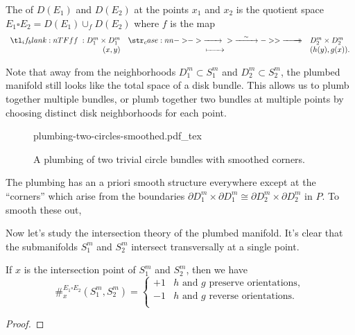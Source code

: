 \begin{definition}\label{def:plumbing}
	The  of $D(E_1)$ and $D(E_2)$ at the points $x_1$ and $x_2$ is the quotient space $E_1\square E_2 =D(E_1)\cup_f D(E_2)$ where $f$ is the map
	\[
		\lkxfunc{f}{D_1^m\times D_1^m}{D_2^m\times D_2^m}{(x,y)}{(h(y), g(x)).}
	\]
\end{definition}

Note that away from the neighborhoods $D_1^m\subset S^m_1$ and $D_2^m\subset S^m_2$, the plumbed manifold still looks like the total space of a disk bundle. This allows us to plumb together multiple bundles, or plumb together two bundles at multiple points by choosing distinct disk neighborhoods for each point.

\begin{figure}[ht]
	\centering
	{plumbing-two-circles-smoothed.pdf_tex}
	\caption{A plumbing of two trivial circle bundles with smoothed corners.}\label{fig:plumbing-two-circles}
\end{figure}

\begin{remark}\label{rmk:smoothing-corners}
	The plumbing has an a priori smooth structure everywhere except at the ``corners'' which arise from the boundaries $\partial D_1^m\times \partial D_1^m \cong \partial D_2^m\times \partial D_2^m$ in $P$. To smooth these out, 
\end{remark}

Now let's study the intersection theory of the plumbed manifold. It's clear that the submanifolds $S_1^m$ and $S_2^m$ intersect transversally at a single point.

\begin{proposition}
	If $x$ is the intersection point of $S_1^m$ and $S_2^m$, then we have
	\[
		\#^{E_1\square E_2}_{x}(S_1^m, S_2^m) = \begin{cases}
			+1 & h \textrm{ and }g\textrm{ preserve orientations}, \\
			-1 & h \textrm{ and }g\textrm{ reverse orientations}.  \\
		\end{cases}
	\]
\end{proposition}
\begin{proof}
\end{proof}

